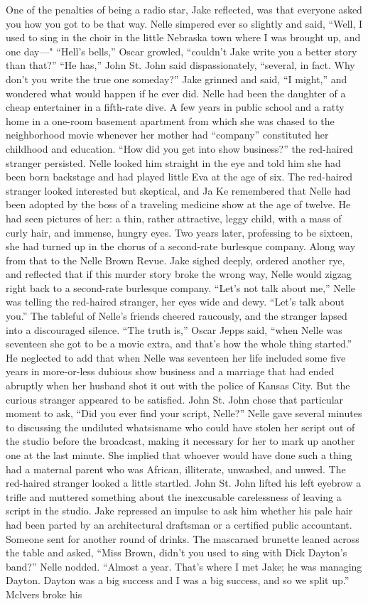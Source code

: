 \documentclass{novel}
\begin{document}
One of the penalties of being a radio star, Jake reflected, was that everyone asked you how you got to be that way. Nelle simpered ever so slightly and said, “Well, I used to sing in the choir in the little Nebraska town where I was brought up, and one day—" “Hell’s bells,” Oscar growled, “couldn’t Jake write you a better story than that?” “He has,” John St. John said dispassionately, “several, in fact. Why don’t you write the true one someday?” Jake grinned and said, “I might,” and wondered what would happen if he ever did. Nelle had been the daughter of a cheap entertainer in a fifth-rate dive. A few years in public school and a ratty home in a one-room basement apartment from which she was chased to the neighborhood movie whenever her mother had “company” constituted her childhood and education. “How did you get into show business?” the red-haired stranger persisted. Nelle looked him straight in the eye and told him she had been born backstage and had played little Eva at the age of six. The red-haired stranger looked interested but skeptical, and Ja Ke remembered that Nelle had been adopted by the boss of a traveling medicine show at the age of twelve. He had seen pictures of her: a thin, rather attractive, leggy child, with a mass of curly hair, and immense, hungry eyes. Two years later, professing to be sixteen, she had turned up in the chorus of a second-rate burlesque company. Along way from that to the Nelle Brown Revue. Jake sighed deeply, ordered another rye, and reflected that if this murder story broke the wrong way, Nelle would zigzag right back to a second-rate burlesque company. “Let’s not talk about me,” Nelle was telling the red-haired stranger, her eyes wide and dewy. “Let’s talk about you.” The tableful of Nelle’s friends cheered raucously, and the stranger lapsed into a discouraged silence. “The truth is,” Oscar Jepps said, “when Nelle was seventeen she got to be a movie extra, and that’s how the whole thing started.” He neglected to add that when Nelle was seventeen her life included some five years in more-or-less dubious show business and a marriage that had ended abruptly when her husband shot it out with the police of Kansas City. But the curious stranger appeared to be satisfied. John St. John chose that particular moment to ask, “Did you ever find your script, Nelle?” Nelle gave several minutes to discussing the undiluted whatsisname who could have stolen her script out of the studio before the broadcast, making it necessary for her to mark up another one at the last minute. She implied that whoever would have done such a thing had a maternal parent who was African, illiterate, unwashed, and unwed. The red-haired stranger looked a little startled. John St. John lifted his left eyebrow a trifle and muttered something about the inexcusable carelessness of leaving a script in the studio. Jake repressed an impulse to ask him whether his pale hair had been parted by an architectural draftsman or a certified public accountant. Someone sent for another round of drinks. The mascaraed brunette leaned across the table and asked, “Miss Brown, didn’t you used to sing with Dick Dayton’s band?” Nelle nodded. “Almost a year. That’s where I met Jake; he was managing Dayton. Dayton was a big success and I was a big success, and so we split up.” Mclvers broke his 
\end{document}
